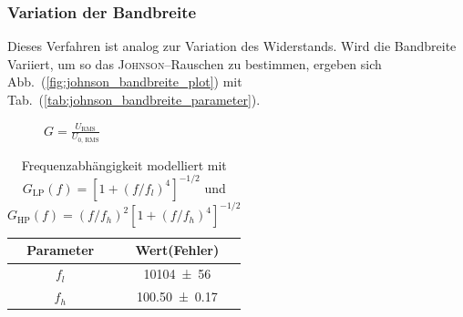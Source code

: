 \documentclass[sn-mathphys-num,iicol]{sn-jnl}
\theoremstyle{thmstyleone}
\theoremstyle{thmstyletwo}
\theoremstyle{thmstylethree}
\begin{document}
\subsubsection{Variation der Bandbreite}
Dieses Verfahren ist analog zur Variation des Widerstands.
Wird die Bandbreite Variiert, um so das \textsc{Johnson}--Rauschen zu bestimmen, ergeben sich Abb.\ (\ref{fig:johnson_bandbreite_plot}) mit Tab.\ (\ref{tab:johnson_bandbreite_parameter}). %

\begin{figure}[h]
	\centering
	\resizebox{.5\textwidth}{!}{}
	\caption{$G=\frac{U_{\text{RMS}}}{U_{0\text{, RMS}}}$}
\end{figure}
\begin{table}[h!]
	\centering
	\begin{tabular}{cc}
		\textbf{Parameter} & {\textbf{Wert(Fehler)}} \\
		\hline
		$f_l$              & \SI{10104 \pm 56}{}     \\
		$f_h$              & \SI{100.50 \pm 0.17}{}  \\
	\end{tabular}
	\label{tab:parameter}
	\caption{Frequenzabhängigkeit modelliert mit $G_\text{LP}(f)=\left[1+(f/f_l)^4\right]^{-1/2}$ und $G_\text{HP}(f)=(f/f_h)^2\left[1+(f/f_h)^4\right]^{-1/2}$}
\end{table}
\end{document}
